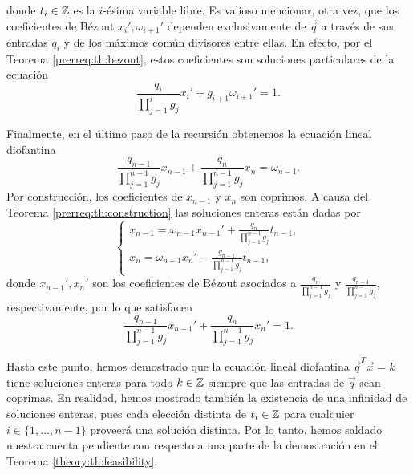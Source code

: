 donde $t_i \in \mathbb{Z}$ es la $i$-ésima variable libre. Es valioso mencionar, otra vez, que los
coeficientes de Bézout $x_i', \omega_{i+1}'$ dependen exclusivamente de $\vec{q}$ a través de sus
entradas $q_i$ y de los máximos común divisores entre ellas. En efecto, por el Teorema
\ref{prerreq:th:bezout}, estos coeficientes son soluciones particulares de la ecuación
\begin{equation}
	\label{dummy:eq:bez-eq}
	\frac{q_i}{\prod_{j=1}^{i}g_j}x_i' + g_{i+1}\omega_{i+1}' = 1.
\end{equation}

Finalmente, en el último paso de la recursión obtenemos la ecuación lineal diofantina
\begin{equation}
	\label{eq:last-equation}
	\frac{q_{n-1}}{\prod_{j=1}^{n-1}g_j}x_{n-1} +
	\frac{q_{n}}{\prod_{j=1}^{n-1}g_j}x_n
	= \omega_{n-1}.
\end{equation}
Por construcción, los coeficientes de $x_{n - 1}$ y $x_n$ son coprimos. A causa del Teorema
\ref{prerreq:th:construction} las soluciones enteras están dadas por
\begin{equation}
	\label{eq:last-solution}
	\begin{cases}
		x_{n-1} = \omega_{n-1}x_{n-1}' + \frac{q_n}{\prod_{j=1}^{n-1}g_j}t_{n-1}, \\
		x_n = \omega_{n-1}x_n' - \frac{q_{n-1}}{\prod_{j=1}^{n-1}g_j}t_{n-1},
	\end{cases}
\end{equation}
donde $x_{n-1}', x_n'$ son los coeficientes de Bézout asociados a
$\frac{q_n}{\prod_{j=1}^{n-1}g_j}$ y $\frac{q_{n-1}}{\prod_{j=1}^{n-1}g_j}$,
respectivamente, por lo que satisfacen
\begin{equation}
	\label{eq:last-equation-bez}
	\frac{q_{n-1}}{\prod_{j=1}^{n-1}g_j}x_{n-1}' +
	\frac{q_{n}}{\prod_{j=1}^{n-1}g_j}x_n'
	= 1.
\end{equation}

Hasta este punto, hemos demostrado que la ecuación lineal diofantina $\vec{q}^T\vec{x} = k$ tiene
soluciones enteras para todo $k \in \mathbb{Z}$ siempre que las entradas de $\vec{q}$ sean coprimas. En
realidad, hemos mostrado también la existencia de una infinidad de soluciones enteras, pues cada
elección distinta de $t_i \in \mathbb{Z}$ para cualquier $i \in \lbrace 1, \ldots, n - 1\rbrace$ proveerá una
solución distinta. Por lo tanto, hemos saldado nuestra cuenta pendiente con respecto a una parte de
la demostración en el Teorema \ref{theory:th:feasibility}.

